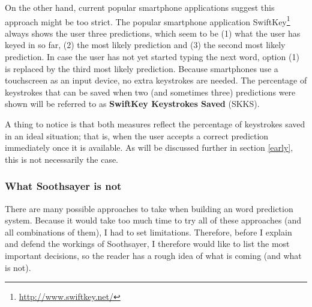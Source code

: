 \documentclass[12pt]{article}
\begin{document}
On the other hand, current popular smartphone applications suggest this approach might be too strict. The popular smartphone application SwiftKey\footnote{\url{http://www.swiftkey.net/}} always shows the user three predictions, which seem to be (1) what the user has keyed in so far, (2) the most likely prediction and (3) the second most likely prediction. In case the user has not yet started typing the next word, option (1) is replaced by the third most likely prediction. Because smartphones use a touchscreen as an input device, no extra keystrokes are needed. The percentage of keystrokes that can be saved when two (and sometimes three) predictions were shown will be referred to as \textbf{SwiftKey Keystrokes Saved} (SKKS).

A thing to notice is that both measures reflect the percentage of keystrokes saved in an ideal situation; that is, when the user accepts a correct prediction immediately once it is available. As will be discussed further in section \ref{early}, this is not necessarily the case. 

\subsubsection{What Soothsayer is not} \label{whatnot}
There are many possible approaches to take when building an word prediction system. Because it would take too much time to try all of these approaches (and all combinations of them), I had to set limitations. Therefore, before I explain and defend the workings of Soothsayer, I therefore would like to list the most important decisions, so the reader has a rough idea of what is coming (and what is not). 
\end{document}
